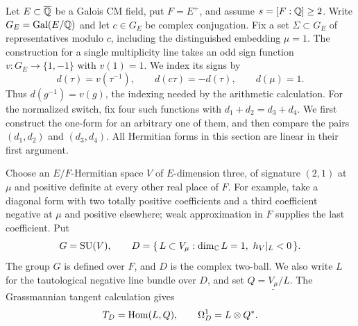 Let \(E\subset\overline{\mathbb{Q}}\) be a Galois CM field, put \(F=E^+\), and assume
\(s=[F:\mathbb{Q}]\ge2\).  Write \(G_E=\operatorname{Gal}(E/\mathbb{Q})\) and let \(c\in G_E\)
be complex conjugation.  Fix a set \(\Sigma\subset G_E\) of
representatives modulo \(c\), including the distinguished embedding
\(\mu=1\).  The construction for a single multiplicity line takes an
odd sign function \(v:G_E\to\{1,-1\}\) with \(v(1)=1\).  We index
its signs by
\begin{equation}\label{eq:theta-sign-inversion}
 d(\tau)=v(\tau^{-1}),\qquad
 d(c\tau)=-d(\tau),\qquad d(\mu)=1.
\end{equation}
Thus \(d(g^{-1})=v(g)\), the indexing needed by the arithmetic
calculation.  For the normalized switch, fix four such functions with
\(d_1+d_2=d_3+d_4\).  We first construct the one-form for an arbitrary
one of them, and then compare the pairs \((d_1,d_2)\) and
\((d_3,d_4)\).  All Hermitian forms in this section are linear in
their first argument.

Choose an \(E/F\)-Hermitian space \(V\) of \(E\)-dimension three,
of signature \((2,1)\) at \(\mu\) and positive definite at every
other real place of \(F\).  For example, take a diagonal form with two
totally positive coefficients and a third coefficient negative at
\(\mu\) and positive elsewhere; weak approximation in \(F\) supplies
the last coefficient.  Put
\[
 G=\operatorname{SU}(V),\qquad
 D=\{\,L\subset V_\mu:\dim_{\mathbb{C}} L=1,\ h_V|_L<0\,\}.
\]
The group \(G\) is defined over \(F\), and \(D\) is the complex
two-ball.  We also write \(L\) for the tautological negative line
bundle over \(D\), and set \(Q=\underline{V_\mu}/L\).  The
Grassmannian tangent calculation gives
\begin{equation}\label{eq:theta-cotangent}
 T_D=\operatorname{Hom}(L,Q),\qquad \Omega_D^1=L\otimes Q^*.
\end{equation}

